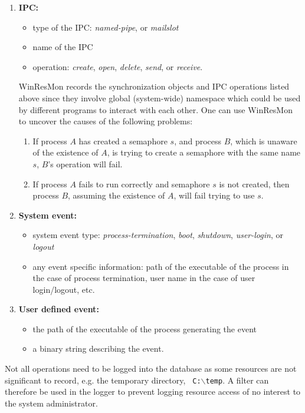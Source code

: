 \begin{enumerate}
\item {\bf IPC:}
\begin{itemize}
\item type of the IPC: {\em named-pipe}, or {\em mailslot}
\item name of the IPC
\item operation: {\em create}, {\em open}, {\em delete}, {\em send}, or {\em
receive}. 
\end{itemize}

WinResMon records the synchronization objects and IPC operations listed above
since they involve global (system-wide) namespace which could
be used by different programs to interact with each other.
One can use WinResMon to uncover the causes of 
the following problems:

\begin{enumerate}

\item If process $A$ has created a semaphore $s$, and process $B$, which
is unaware of the existence of $A$, is trying to create a semaphore with the
same name $s$, $B$'s operation will fail.

\item If process $A$ fails to run correctly and semaphore $s$ is not
created, then process $B$, assuming the existence of $A$, will fail trying to
use $s$.
\end{enumerate}

\item {\bf System event:}
\begin{itemize}
\item system event type: {\em process-termination}, {\em boot}, {\em shutdown},
{\em user-login}, or {\em logout}
\item any event specific information: path of the executable of the process in
the case of process termination, user name in the case of user login/logout,
etc. 
\end{itemize}

\item {\bf User defined event:}
\begin{itemize}
\item the path of the executable of the process generating the event 
\item a binary string describing the event. 
\end{itemize}

\end{enumerate}

Not all operations need to be logged into the database as some resources are
not significant to record, e.g.  the temporary directory, {\tt
C:$\backslash$temp}.  A filter can therefore be used in the logger to prevent
logging resource access of no interest to the system administrator.


